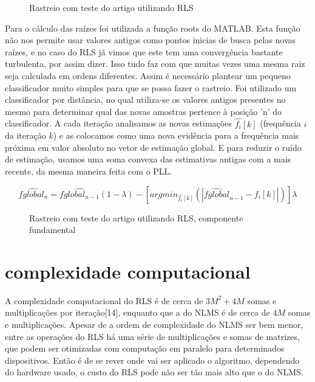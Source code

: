 \begin{figure}[H]
	\centering    
	\def\svgwidth{\columnwidth}
	
	\caption{Rastreio com teste do artigo utilizando RLS}
	\label{fig:rastreio_final}
\end{figure}


Para o cálculo das raízes foi utilizada a função roots do MATLAB. Esta função não nos permite usar valores antigos como pontos inicias de busca pelas novas raízes, e no caso do RLS já vimos que este tem uma convergência bastante turbulenta, por assim dizer. Isso tudo faz com que muitas vezes uma mesma raiz seja calculada em ordens diferentes. Assim é necessário plantear um pequeno classificador muito simples para que se possa fazer o rastreio. Foi utilizado um classificador por distância, no qual utiliza-se os valores antigos presentes no mesmo para determinar qual das novas amostras pertence à posição 'n' do classificador. A cada iteração analisamos as novas estimações $\hat{f_i}[k]$ (frequência $i$ da iteração $k$) e as colocamos como uma nova evidência para a frequência mais próxima em valor absoluto no vetor de estimação global. E para reduzir o ruído de estimação, usamos uma soma convexa das estimativas antigas com a mais recente, da mesma maneira feita com o PLL.

\begin{equation}
	\hat{fglobal_n}=\hat{fglobal_{n-1}}(1-\lambda)-[argmin_{\hat{f_i}[k]}(|\hat{fglobal}_{n-1}-f_i[k]|)]\lambda
\end{equation}

\begin{figure}[H]
	\centering    
	\def\svgwidth{\columnwidth}
	
	\caption{Rastreio com teste do artigo utilizando RLS, componente fundamental}
	\label{fig:rastreio_final}
\end{figure}

\section{complexidade computacional}

A complexidade computacional do RLS é de cerca de $3M^2 + 4M$ somas e multiplicações por iteração[14], enquanto que a do NLMS é de cerca de $4M$ somas e multiplicações. Apesar de a ordem de complexidade do NLMS ser bem menor, entre as operações do RLS há uma série de multiplicações e somas de matrizes, que podem ser otimizadas com computação em paralelo para determinados dispositivos. Então é de se rever onde vai ser aplicado o algoritmo, dependendo do hardware usado, o custo do RLS pode não ser tão mais alto que o do NLMS.

